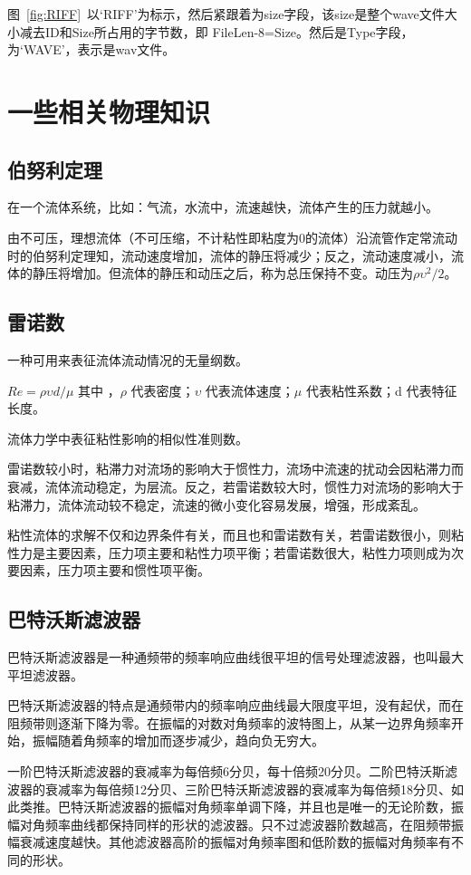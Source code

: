 图~\ref{fig:RIFF}~以‘RIFF’为标示，然后紧跟着为size字段，该size是整个wave文件大小减去ID和Size所占用的字节数，即 FileLen-8=Size。然后是Type字段，为‘WAVE’，表示是wav文件。

\section{ 一些相关物理知识}
\subsection{伯努利定理}
在一个流体系统，比如：气流，水流中，流速越快，流体产生的压力就越小。


由不可压，理想流体（不可压缩，不计粘性即粘度为0的流体）沿流管作定常流动时的伯努利定理知，流动速度增加，流体的静压将减少；反之，流动速度减小，流体的静压将增加。但流体的静压和动压之后，称为总压保持不变。动压为$\rho\upsilon^2/2$。

\subsection{雷诺数}

一种可用来表征流体流动情况的无量纲数。


$Re=\rho\upsilon d/\mu$ 
其中 ，$\rho$ \mbox{代表密度}；$\upsilon$ \mbox{代表流体速度}；$\mu$ \mbox{代表粘性系数}；d \mbox{代表特征长度}。

流体力学中表征粘性影响的相似性准则数。


雷诺数较小时，粘滞力对流场的影响大于惯性力，流场中流速的扰动会因粘滞力而衰减，流体流动稳定，为层流。反之，若雷诺数较大时，惯性力对流场的影响大于粘滞力，流体流动较不稳定，流速的微小变化容易发展，增强，形成紊乱。


粘性流体的求解不仅和边界条件有关，而且也和雷诺数有关，若雷诺数很小，则粘性力是主要因素，压力项主要和粘性力项平衡；若雷诺数很大，粘性力项则成为次要因素，压力项主要和惯性项平衡。

\subsection{巴特沃斯滤波器}
巴特沃斯滤波器是一种通频带的频率响应曲线很平坦的信号处理滤波器，也叫最大平坦滤波器。


巴特沃斯滤波器的特点是通频带内的频率响应曲线最大限度平坦，没有起伏，而在阻频带则逐渐下降为零。在振幅的对数对角频率的波特图上，从某一边界角频率开始，振幅随着角频率的增加而逐步减少，趋向负无穷大。


一阶巴特沃斯滤波器的衰减率为每倍频6分贝，每十倍频20分贝。二阶巴特沃斯滤波器的衰减率为每倍频12分贝、三阶巴特沃斯滤波器的衰减率为每倍频18分贝、如此类推。巴特沃斯滤波器的振幅对角频率单调下降，并且也是唯一的无论阶数，振幅对角频率曲线都保持同样的形状的滤波器。只不过滤波器阶数越高，在阻频带振幅衰减速度越快。其他滤波器高阶的振幅对角频率图和低阶数的振幅对角频率有不同的形状。

